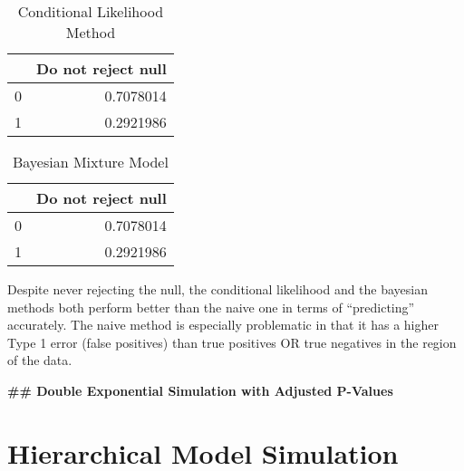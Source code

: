 \documentclass[12pt,twoside]{dukestatscithesis}
\theoremstyle{definition}
\theoremstyle{definition}
\theoremstyle{definition}
\theoremstyle{remark}
\begin{document}
\begin{table}

\caption{\label{tab:unnamed-chunk-8}Conditional Likelihood Method}
\centering
\begin{tabular}[t]{l|r}
\hline
  & Do not reject null\\
\hline
0 & 0.7078014\\
\hline
1 & 0.2921986\\
\hline
\end{tabular}
\end{table}
\begin{Shaded}
\begin{Highlighting}[]
\NormalTok{(}\OperatorTok{$}\OperatorTok{$}\OperatorTok{>=}\OperatorTok{&}\OperatorTok{$}\OperatorTok{<=}\NormalTok{)}\OperatorTok{/}\NormalTok{(results)[}\NormalTok{], } \NormalTok{(}\NormalTok{), } \NormalTok{, } \NormalTok{)}
\end{Highlighting}
\end{Shaded}
\begin{table}

\caption{\label{tab:unnamed-chunk-8}Bayesian Mixture Model}
\centering
\begin{tabular}[t]{l|r}
\hline
  & Do not reject null\\
\hline
0 & 0.7078014\\
\hline
1 & 0.2921986\\
\hline
\end{tabular}
\end{table}
Despite never rejecting the null, the conditional likelihood and the
bayesian methods both perform better than the naive one in terms of
``predicting'' accurately. The naive method is especially problematic in
that it has a higher Type 1 error (false positives) than true positives
OR true negatives in the region of the data.

\textbf{\#\# Double Exponential Simulation with Adjusted P-Values}

\chapter{Hierarchical Model
Simulation}\label{hierarchical-model-simulation}
\end{document}
